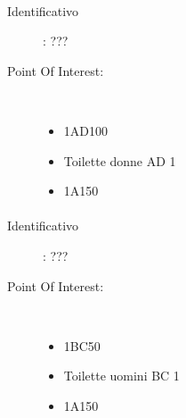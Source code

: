\documentclass[../SperimentazioniPratiche.tex]{subfiles}
\begin{document}
			\paragraph*{}
			\label{01000}
			\begin{tcolorbox}[fonttitle=\bfseries, 
								adjusted title={\Large Beacon 01000},
								sharp corners=south,
								colback=white, 
								colframe=white!50!blue!75!black]
								
				\begin{description}
					\item[Identificativo]: ???

					\tcbline					
					
					\item[Point Of Interest:] \ \par
					\begin{itemize}
						\item 1AD100
						\item Toilette donne AD 1
						\item 1A150
					\end{itemize}					   				
				\end{description}  				
			\end{tcolorbox}
			
			\paragraph*{}
			\label{01001}
			\begin{tcolorbox}[fonttitle=\bfseries, 
								adjusted title={\Large Beacon 01001},
								sharp corners=south,
								colback=white, 
								colframe=white!50!blue!75!black]
								
				\begin{description}
					\item[Identificativo]: ???

					\tcbline					
					
					\item[Point Of Interest:] \ \par
					\begin{itemize}
						\item 1BC50
						\item Toilette uomini BC 1
						\item 1A150
					\end{itemize}					   				
				\end{description}  				
			\end{tcolorbox}
			
\end{document}
